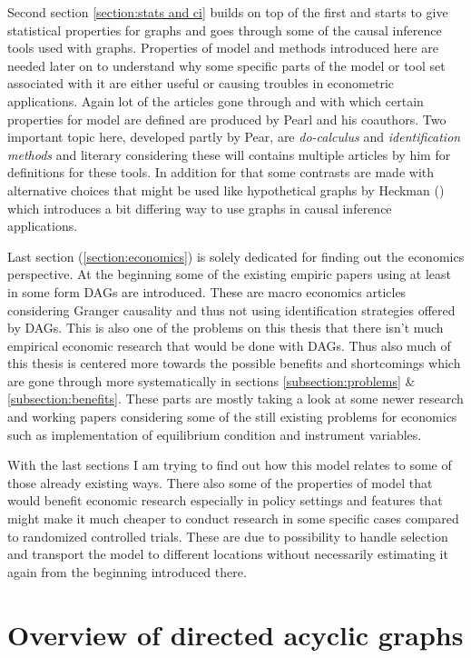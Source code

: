 \documentclass[main=english,12pt,a4paper,pdftex,econ,utf8]{aaltothesis}
\begin{document}
Second section \ref{section:stats and ci} builds on top of the first and starts to give statistical properties for graphs and goes through some of the causal inference tools used with graphs. Properties of model and methods introduced here are needed later on to understand why some specific parts of the model or tool set associated with it are either useful or causing troubles in econometric applications. Again lot of the articles gone through and with which certain properties for model are defined are produced by Pearl and his coauthors. Two important topic here, developed partly by Pear, are \textit{do-calculus} and \textit{identification methods} and literary considering these will contains multiple articles by him for definitions for these tools. In addition for that some contrasts are made with alternative choices that might be used like hypothetical graphs by Heckman (\cite{Heckman2015}) which introduces a bit differing way to use graphs in causal inference applications.

Last section (\ref{section:economics}) is solely dedicated for finding out the economics perspective. At the beginning some of the existing empiric papers using at least in some form DAGs are introduced. These are macro economics articles considering Granger causality and thus not using identification strategies offered by DAGs. This is also one of the problems on this thesis that there isn't much empirical economic research that would be done with DAGs. Thus also much of this thesis is centered more towards the possible benefits and shortcomings which are gone through more systematically in sections \ref{subsection:problems} \& \ref{subsection:benefits}. These parts are mostly taking a look at some newer research and working papers considering some of the still existing problems for economics such as implementation of equilibrium condition and instrument variables.

With the last sections I am trying to find out how this model relates to some of those already existing ways. There also some of the properties of model that would benefit economic research especially in policy settings and features that might make it much cheaper to conduct research in some specific cases compared to randomized controlled trials. These are due to possibility to handle selection and transport the model to different locations without necessarily estimating it again from the beginning introduced there.

\clearpage

\section{Overview of directed acyclic graphs} \label{section:overview}
\end{document}

